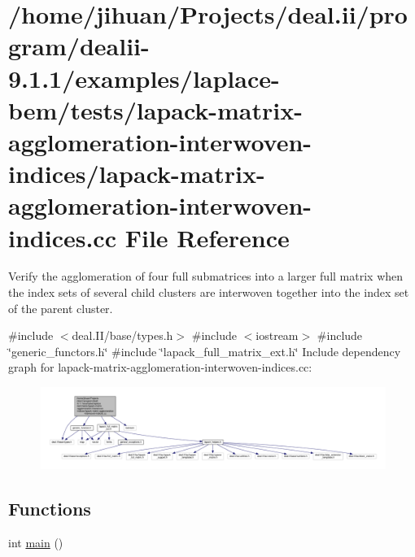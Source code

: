 \hypertarget{lapack-matrix-agglomeration-interwoven-indices_8cc}{}\section{/home/jihuan/\+Projects/deal.ii/program/dealii-\/9.1.1/examples/laplace-\/bem/tests/lapack-\/matrix-\/agglomeration-\/interwoven-\/indices/lapack-\/matrix-\/agglomeration-\/interwoven-\/indices.cc File Reference}
\label{lapack-matrix-agglomeration-interwoven-indices_8cc}


Verify the agglomeration of four full submatrices into a larger full matrix when the index sets of several child clusters are interwoven together into the index set of the parent cluster.  


{\ttfamily \#include $<$deal.\+I\+I/base/types.\+h$>$}\newline
{\ttfamily \#include $<$iostream$>$}\newline
{\ttfamily \#include \char`\"{}generic\+\_\+functors.\+h\char`\"{}}\newline
{\ttfamily \#include \char`\"{}lapack\+\_\+full\+\_\+matrix\+\_\+ext.\+h\char`\"{}}\newline
Include dependency graph for lapack-\/matrix-\/agglomeration-\/interwoven-\/indices.cc\+:\nopagebreak
\begin{figure}[H]
\begin{center}
\leavevmode
\includegraphics[width=350pt]{lapack-matrix-agglomeration-interwoven-indices_8cc__incl}
\end{center}
\end{figure}
\subsection*{Functions}
\begin{DoxyCompactItemize}
\item 
int \hyperlink{lapack-matrix-agglomeration-interwoven-indices_8cc_ae66f6b31b5ad750f1fe042a706a4e3d4}{main} ()
\end{DoxyCompactItemize}


